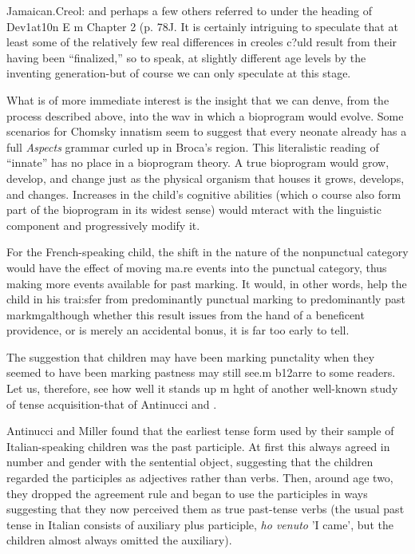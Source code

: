 Jamaican.Creol: and perhaps a few others referred to under the heading of Dev1at10n E m Chapter 2 (p. 78J. It is certainly intriguing to speculate that at least some of the relatively few real differences in creoles c?uld result from their having been ``finalized,'' so to speak, at slightly
different age levels by the inventing generation-but of course we can only speculate at this stage.

What is of more immediate interest is the insight that we can denve, from the process described above, into the wav in which a bio\-program would evolve. Some scenarios for Chomsky innatism seem to suggest that every neonate already has a full \textit{Aspects} grammar curled
up in Broca's region. This literalistic reading of ``innate'' has no place in a bioprogram theory. A true bioprogram would grow, develop, and change just as the physical organism that houses it grows, develops, and changes. Increases in the child's cognitive abilities (which o course also form part of the bioprogram in its widest sense) would mteract with the linguistic component and progressively modify it.

For the French-speaking child, the shift in the nature of the
nonpunctual category would have the effect of moving ma.re events into the punctual category, thus making more events available for past marking. It would, in other words, help the child in his trai:sfer from predominantly punctual marking to predominantly past markmg\-although whether this result issues from the hand of a beneficent providence, or is merely an accidental bonus, it is far too early to tell.

The suggestion that children may have been marking punctality when they seemed to have been marking pastness may still see.m b12arre to some readers. Let us, therefore, see how well it stands up m hght of another well-known study of tense acquisition-that of Antinucci and
\citet{Miller1976}.

Antinucci and Miller found that the earliest tense form used by
their sample of Italian-speaking children was the past participle. At first this always agreed in number and gender with the sentential object, suggesting that the children regarded the participles as adjectives rather than verbs. Then, around age two, they dropped the agreement rule and began to use the participles in ways suggesting that they now perceived them as true past-tense verbs (the usual past tense in Italian consists of auxiliary plus participle, \textit{ho venuto }'I came', but the children almost always omitted the auxiliary).

